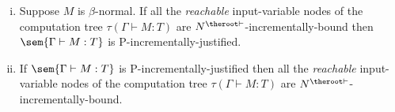 \begin{proposition}
\hfill

 \label{prop:Nher_incrbound_iff_incrjustified}

\begin{enumerate}[(i)]
\item Suppose $M$ is $\beta$-normal. If all the \emph{reachable} input-variable nodes of the computation tree
$\tau(\Gamma \vdash M : T)$ are
$N^{\theroot\vdash}$-incrementally-bound then $\sem{\Gamma
\vdash M : T}$ is P-incrementally-justified.

\item If $\sem{\Gamma \vdash M : T}$ is
P-incrementally-justified then all the \emph{reachable}
input-variable nodes of the computation tree $\tau(\Gamma \vdash
M : T)$ are $N^{\theroot\vdash}$-incrementally-bound.
\end{enumerate}
\end{proposition}

